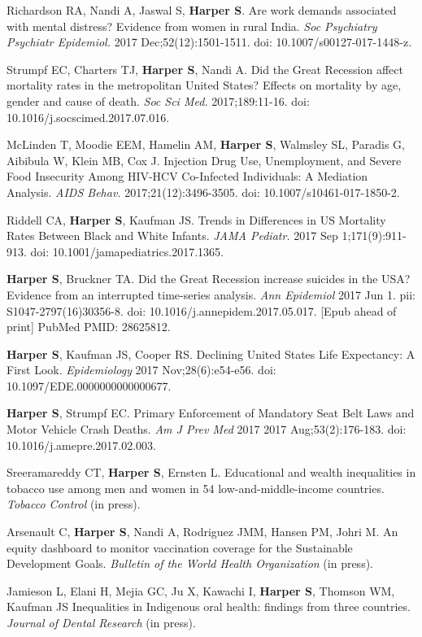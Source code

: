\documentclass[
  letterpaper,
  DIV=11,
  numbers=noendperiod]{scrartcl}
\begin{document}
Richardson RA, Nandi A, Jaswal S, \textbf{Harper S}. Are work demands
associated with mental distress? Evidence from women in rural India.
\emph{Soc Psychiatry Psychiatr Epidemiol.} 2017 Dec;52(12):1501-1511.
doi: 10.1007/s00127-017-1448-z.

Strumpf EC, Charters TJ, \textbf{Harper S}, Nandi A. Did the Great
Recession affect mortality rates in the metropolitan United States?
Effects on mortality by age, gender and cause of death. \emph{Soc Sci
Med.} 2017;189:11-16. doi: 10.1016/j.socscimed.2017.07.016.

McLinden T, Moodie EEM, Hamelin AM, \textbf{Harper S}, Walmsley SL,
Paradis G, Aibibula W, Klein MB, Cox J. Injection Drug Use,
Unemployment, and Severe Food Insecurity Among HIV-HCV Co-Infected
Individuals: A Mediation Analysis. \emph{AIDS Behav.}
2017;21(12):3496-3505. doi: 10.1007/s10461-017-1850-2.

Riddell CA, \textbf{Harper S}, Kaufman JS. Trends in Differences in US
Mortality Rates Between Black and White Infants. \emph{JAMA Pediatr.}
2017 Sep 1;171(9):911-913. doi: 10.1001/jamapediatrics.2017.1365.

\textbf{Harper S}, Bruckner TA. Did the Great Recession increase
suicides in the USA? Evidence from an interrupted time-series analysis.
\emph{Ann Epidemiol} 2017 Jun 1. pii: S1047-2797(16)30356-8. doi:
10.1016/j.annepidem.2017.05.017. {[}Epub ahead of print{]} PubMed PMID:
28625812.

\textbf{Harper S}, Kaufman JS, Cooper RS. Declining United States Life
Expectancy: A First Look. \emph{Epidemiology} 2017 Nov;28(6):e54-e56.
doi: 10.1097/EDE.0000000000000677.

\textbf{Harper S}, Strumpf EC. Primary Enforcement of Mandatory Seat
Belt Laws and Motor Vehicle Crash Deaths. \emph{Am J Prev Med} 2017 2017
Aug;53(2):176-183. doi: 10.1016/j.amepre.2017.02.003.

Sreeramareddy CT, \textbf{Harper S}, Ernsten L. Educational and wealth
inequalities in tobacco use among men and women in 54
low-and-middle-income countries. \emph{Tobacco Control} (in press).

Arsenault C, \textbf{Harper S}, Nandi A, Rodriguez JMM, Hansen PM, Johri
M. An equity dashboard to monitor vaccination coverage for the
Sustainable Development Goals. \emph{Bulletin of the World Health
Organization} (in press).

Jamieson L, Elani H, Mejia GC, Ju X, Kawachi I, \textbf{Harper S},
Thomson WM, Kaufman JS Inequalities in Indigenous oral health: findings
from three countries. \emph{Journal of Dental Research} (in press).
\end{document}
